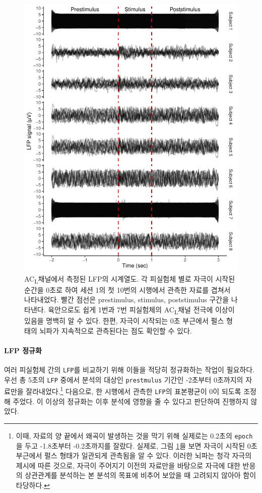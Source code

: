 \documentclass[11pt,onecolumn,twoside,a4size]{gsag3jnl}
\newcommand{\ACL}{AC\textsubscript{L}}
\begin{document}
\begin{figure}[tp]
  \renewcommand{\familydefault}{\sfdefault}\normalfont
  \centering
  \includegraphics[width=0.7\linewidth]{LFP_raw.pdf}
  \caption{\small \ACL 채널에서 측정된 LFP의 시계열도. 각 피실험체 별로 자극이 시작된 순간을 0초로 하여 세션 1의 첫 10번의 시행에서 관측한 자료를 겹쳐서 나타내었다. 빨간 점선은 prestimulus, stimulus, poststimulus 구간을 나타낸다. 육안으로도 쉽게 1번과 7번 피실험체의 \ACL 채널 전극에 이상이 있음을 명백히 알 수 있다. 한편, 자극이 시작되는 0초 부근에서 펄스 형태의 뇌파가 지속적으로 관측된다는 점도 확인할 수 있다.}
  \label{fig:LFP_raw}
\end{figure}

\paragraph{LFP 정규화}

여러 피실험체 간의 \texttt{LFP}를 비교하기 위해 이들을 적당히 정규화하는 작업이 필요하다. 우선 총 5초의 \texttt{LFP} 중에서 분석의 대상인 \texttt{prestmulus} 기간인 -2초부터 0초까지의 자료만을 잘라내었다.\footnote{이때, 자료의 양 끝에서 왜곡이 발생하는 것을 막기 위해 실제로는 0.2초의 \texttt{epoch}을 두고 -1.8초부터 -0.2초까지를 잘랐다. 실제로, 그림 \ref{fig:LFP_raw}을 보면 자극이 시작된 0초 부근에서 펄스 형태가 일관되게 관측됨을 알 수 있다. 이러한 뇌파는 청각 자극의 제시에 따른 것으로, 자극이 주어지기 이전의 자료만을 바탕으로 자극에 대한 반응의 상관관계를 분석하는 본 분석의 목표에 비추어 보았을 때 고려되지 않아아 함이 타당하다.} 다음으로, 한 시행에서 관측한 \texttt{LFP}의 표본평균이 0이 되도록 조정해 주었다. 이 이상의 정규화는 이후 분석에 영향을 줄 수 있다고 판단하여 진행하지 않았다.
\end{document}
